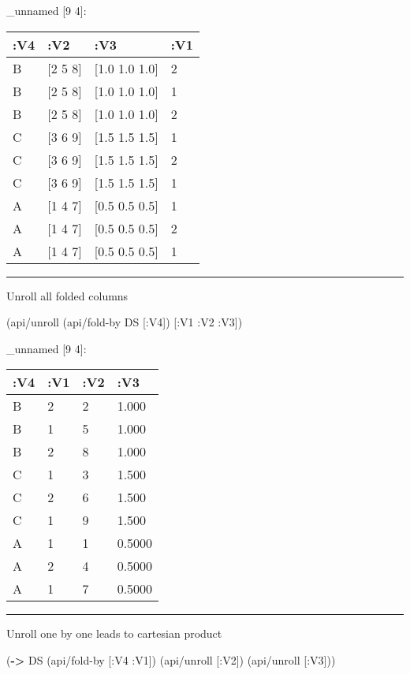 \documentclass[]{article}
\newenvironment{Shaded}{\begin{snugshade}}{\end{snugshade}}
\newcommand{\KeywordTok}[1]{\textcolor[rgb]{0.13,0.29,0.53}{\textbf{#1}}}
\newcommand{\AttributeTok}[1]{\textcolor[rgb]{0.77,0.63,0.00}{#1}}
\newcommand{\NormalTok}[1]{#1}
\begin{document}
\_unnamed {[}9 4{]}:

\begin{longtable}[]{@{}llll@{}}
\toprule
:V4 & :V2 & :V3 & :V1\tabularnewline
\midrule
\endhead
B & {[}2 5 8{]} & {[}1.0 1.0 1.0{]} & 2\tabularnewline
B & {[}2 5 8{]} & {[}1.0 1.0 1.0{]} & 1\tabularnewline
B & {[}2 5 8{]} & {[}1.0 1.0 1.0{]} & 2\tabularnewline
C & {[}3 6 9{]} & {[}1.5 1.5 1.5{]} & 1\tabularnewline
C & {[}3 6 9{]} & {[}1.5 1.5 1.5{]} & 2\tabularnewline
C & {[}3 6 9{]} & {[}1.5 1.5 1.5{]} & 1\tabularnewline
A & {[}1 4 7{]} & {[}0.5 0.5 0.5{]} & 1\tabularnewline
A & {[}1 4 7{]} & {[}0.5 0.5 0.5{]} & 2\tabularnewline
A & {[}1 4 7{]} & {[}0.5 0.5 0.5{]} & 1\tabularnewline
\bottomrule
\end{longtable}

\begin{center}\rule{0.5\linewidth}{0.5pt}\end{center}

Unroll all folded columns

\begin{Shaded}
\begin{Highlighting}[]
\NormalTok{(api/unroll (api/fold-by DS [}\AttributeTok{:V4}\NormalTok{]) [}\AttributeTok{:V1} \AttributeTok{:V2} \AttributeTok{:V3}\NormalTok{])}
\end{Highlighting}
\end{Shaded}

\_unnamed {[}9 4{]}:

\begin{longtable}[]{@{}llll@{}}
\toprule
:V4 & :V1 & :V2 & :V3\tabularnewline
\midrule
\endhead
B & 2 & 2 & 1.000\tabularnewline
B & 1 & 5 & 1.000\tabularnewline
B & 2 & 8 & 1.000\tabularnewline
C & 1 & 3 & 1.500\tabularnewline
C & 2 & 6 & 1.500\tabularnewline
C & 1 & 9 & 1.500\tabularnewline
A & 1 & 1 & 0.5000\tabularnewline
A & 2 & 4 & 0.5000\tabularnewline
A & 1 & 7 & 0.5000\tabularnewline
\bottomrule
\end{longtable}

\begin{center}\rule{0.5\linewidth}{0.5pt}\end{center}

Unroll one by one leads to cartesian product

\begin{Shaded}
\begin{Highlighting}[]
\NormalTok{(}\KeywordTok{->}\NormalTok{ DS}
\NormalTok{    (api/fold-by [}\AttributeTok{:V4} \AttributeTok{:V1}\NormalTok{])}
\NormalTok{    (api/unroll [}\AttributeTok{:V2}\NormalTok{])}
\NormalTok{    (api/unroll [}\AttributeTok{:V3}\NormalTok{]))}
\end{Highlighting}
\end{Shaded}
\end{document}
